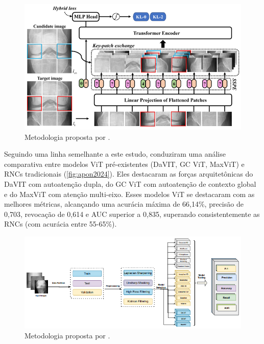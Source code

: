 \begin{figure}[ht]
    \centering
    \includegraphics[width=\textwidth]{figs/wang2024.png}
    \caption{Metodologia proposta por .}
    \label{fig:wang2024}
\end{figure}

Seguindo uma linha semelhante a este estudo,  conduziram uma análise comparativa entre modelos ViT pré-existentes (DaVIT, GC ViT, MaxViT) e RNCs tradicionais (\autoref{fig:apon2024}). Eles destacaram as forças arquitetônicas do DaVIT com autoatenção dupla, do GC ViT com autoatenção de contexto global e do MaxViT com atenção multi-eixo. Esses modelos ViT se destacaram com as melhores métricas, alcançando uma acurácia máxima de 66,14\%, precisão de 0,703, revocação de 0,614 e AUC superior a 0,835, superando consistentemente as RNCs (com acurácia entre 55-65\%).

\begin{figure}[ht]
    \centering
    \includegraphics[width=\textwidth]{figs/apon2024.png}
    \caption{Metodologia proposta por .}
    \label{fig:apon2024}
\end{figure}